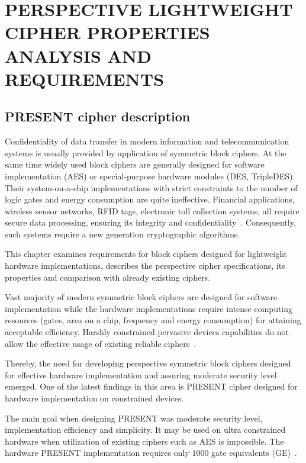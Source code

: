 % 
% 

\chapter{PERSPECTIVE LIGHTWEIGHT CIPHER PROPERTIES ANALYSIS AND REQUIREMENTS}
\label{sec:lightweight}

\section{PRESENT cipher description}

Confidentiality of data transfer in modern information and telecommunication
systems is usually provided by application of symmetric block ciphers.  At the
same time widely used block ciphers are generally designed for software
implementation (AES) or special-purpose hardware modules (DES, TripleDES).
Their system-on-a-chip implementations with strict constraints to the number of
logic gates and energy consumption are quite ineffective.  Financial
applications, wireless sensor networks, RFID tags, electronic toll collection
systems, all require secure data processing, ensuring its integrity and
confidentiality~\cite{lwc:poschmann:2007}.  Consequently, such systems require a
new generation cryptographic algorithms.

This chapter examines requirements for block ciphers designed for lightweight
hardware implementations, describes the perspective cipher specifications,
its properties and comparison with already existing ciphers.

Vast majority of modern symmetric block ciphers are designed for software
implementation while the hardware implementations require intense computing
resources (gates, area on a chip, frequency and energy consumption) for
attaining acceptable efficiency. Harshly constrained pervasive devices
capabilities do not allow the effective usage of existing reliable
ciphers~\cite{lwc:wireless:seys}.

Thereby, the need for developing perspective symmetric block ciphers designed
for effective hardware implementation and assuring moderate security level
emerged.  One of the latest findings in this area is PRESENT cipher
designed for hardware implementation on constrained devices.


The main goal when designing PRESENT was moderate security level,
implementation efficiency and simplicity. It may be used on ultra constrained
hardware when utilization of existing ciphers such as AES is impossible.
The hardware PRESENT implementation requires only $ 1000 $ gate
equivalents (GE)~\cite{secsi:2007}.

